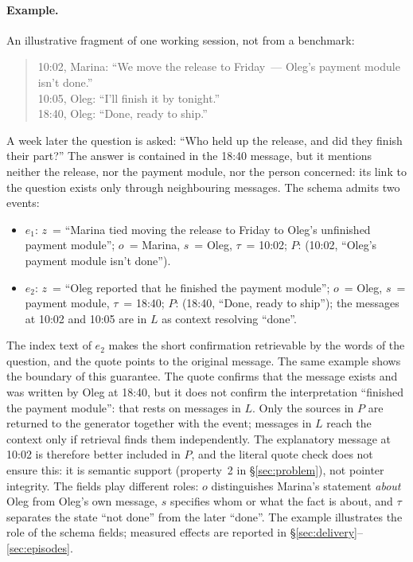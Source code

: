 \documentclass[11pt,a4paper]{article}
\begin{document}
\paragraph{Example.}
An illustrative fragment of one working session, not from a benchmark:
\begin{quote}\small
10:02, Marina: ``We move the release to Friday~--- Oleg's payment module isn't done.''\\
10:05, Oleg: ``I'll finish it by tonight.''\\
18:40, Oleg: ``Done, ready to ship.''
\end{quote}
A week later the question is asked: ``Who held up the release, and did they finish
their part?'' The answer is contained in the 18:40 message, but it mentions neither
the release, nor the payment module, nor the person concerned: its link to the
question exists only through neighbouring messages. The schema admits two events:
\begin{itemize}
\item $e_1$: $z$~= ``Marina tied moving the release to Friday to Oleg's unfinished
payment module''; $o$~= Marina, $s$~= Oleg, $\tau$~= 10:02; $P$: (10:02, ``Oleg's
payment module isn't done'').
\item $e_2$: $z$~= ``Oleg reported that he finished the payment module''; $o$~= Oleg,
$s$~= payment module, $\tau$~= 18:40; $P$: (18:40, ``Done, ready to ship''); the
messages at 10:02 and 10:05 are in $L$ as context resolving ``done''.
\end{itemize}
The index text of $e_2$ makes the short confirmation retrievable by the words of the
question, and the quote points to the original message. The same example shows
the boundary of this guarantee. The quote confirms that the message exists and was
written by Oleg at 18:40, but it does not confirm the interpretation ``finished the
payment module'': that rests on messages in $L$. Only the sources in $P$ are
returned to the generator together with the event; messages in $L$ reach the
context only if retrieval finds them independently. The explanatory message at
10:02 is therefore better included in $P$, and the literal quote check does not
ensure this: it is semantic support (property~2 in §\ref{sec:problem}), not pointer
integrity. The fields play different roles: $o$ distinguishes Marina's statement
\emph{about} Oleg from Oleg's own message, $s$ specifies whom or what the fact is
about, and $\tau$ separates the state ``not done'' from the later ``done''. The
example illustrates the role of the schema fields; measured effects are reported
in §\ref{sec:delivery}--\ref{sec:episodes}.
\end{document}
